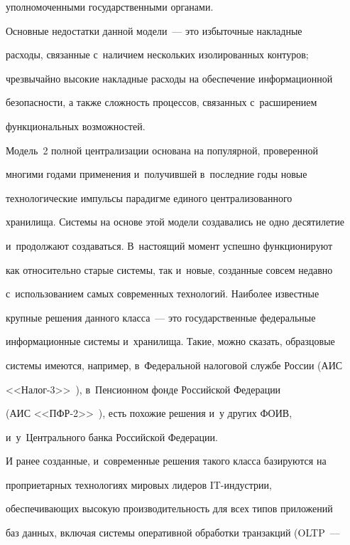 уполномоченными государственными органами.





Основные недостатки данной модели~--- это избыточные накладные 


расходы, связанные с~наличием нескольких изолированных контуров; 


чрезвычайно высокие накладные расходы на обеспечение информационной 


безопасности, а также сложность процессов, связанных с~расширением 


функциональных возможностей.





Модель~2 полной централизации основана на популярной, проверенной 


многими годами применения и~получившей в~последние годы новые 


технологические импульсы парадигме единого централизованного 


хранилища. Системы на основе этой модели создавались не одно десятилетие 


и~продолжают создаваться. В~настоящий момент успешно функционируют 


как относительно старые системы, так и~новые, созданные совсем недавно 


с~использованием самых современных технологий. Наиболее известные 


крупные решения данного класса~--- это государственные федеральные 


информационные системы и~хранилища. Такие, можно сказать, образцовые 


системы имеются, например, в~Федеральной налоговой службе России (АИС 


<<Налог-3>>~\cite{6-bs}), в~Пенсионном фонде Российской Федерации 


(АИС <<ПФР-2>>~\cite{7-bs}), есть похожие решения и~у других ФОИВ, 


и~у~Центрального банка Российской Федерации.





И ранее созданные, и~современные решения такого класса базируются на 


проприетарных технологиях мировых лидеров IT-индустрии, 


обеспечивающих высокую производительность для всех типов приложений 


баз данных, включая системы оперативной обработки транзакций (OLTP~---


